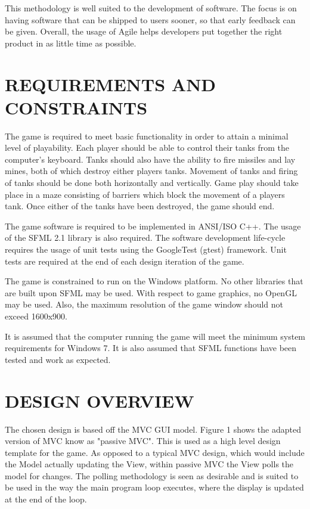 \documentclass[10pt,twocolumn]{witseiepaper}
\begin{document}
This methodology is well suited to the development of software. The focus is on having software that can be shipped to users sooner, so that early feedback can be given. Overall, the usage of Agile helps developers put together the right product in as little time as possible.

%
\section{REQUIREMENTS AND CONSTRAINTS}%
The game is required to meet basic functionality in order to attain a minimal level of playability. Each player should be able to control their tanks from the computer's keyboard. Tanks should also have the ability to fire missiles and lay mines, both of which destroy either players tanks. Movement of tanks and firing of tanks should be done both horizontally and vertically. Game play should take place in a maze consisting of barriers which block the movement of a players tank. Once either of the tanks have been destroyed, the game should end.

The game software is required to be implemented in ANSI/ISO C++. The usage of the SFML 2.1 library is also required. The software development life-cycle requires the usage of unit tests using the GoogleTest (gtest) framework. Unit tests are required at the end of each design iteration of the game.

The game is constrained to run on the Windows platform. No other libraries that are built upon SFML may be used. With respect to game graphics, no OpenGL may be used. Also, the maximum resolution of the game window should not exceed 1600x900. 

It is assumed that the computer running the game will meet the minimum system requirements for Windows 7. It is also assumed that SFML functions have been tested and work as expected.

%
\section{DESIGN OVERVIEW} %
The chosen design is based off the MVC GUI model. Figure 1 shows the adapted version of MVC know as "passive MVC". This is used as a high level design template for the game. As opposed to a typical MVC design, which would include the Model actually updating the View, within passive MVC the View polls the model for changes. The polling methodology is seen as desirable and is suited to be used in the way the main program loop executes, where the display is updated at the end of the loop. 
\end{document}
